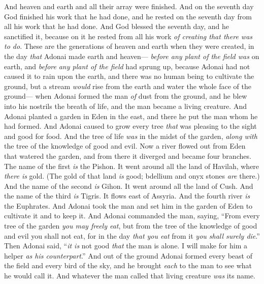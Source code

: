 \begin{biblechapter} %
\verse And heaven and earth and all their array were finished.
\verse And on the seventh day God finished his work that he had done, and he rested on the seventh day from all his work that he had done.
\verse And God blessed the seventh day, and he sanctified it, because on it he rested from all his work \textit{of creating that \textit{there was} to do}.
 These are the generations of heaven and earth when they were created, in the day \textit{that} Adonai made earth and heaven—
\verse \textit{before any plant of the field was} on earth, and \textit{before} \textit{any plant of the field} had sprung up, because Adonai had not caused it to rain upon the earth, and there was no human being to cultivate the ground,
\verse but a stream \textit{would} rise from the earth and water the whole face of the ground—
\verse when Adonai formed the man \textit{of} dust from the ground, and he blew into his nostrils the breath of life, and the man became a living creature.
\verse And Adonai planted a garden in Eden in the east, and there he put the man whom he had formed.
\verse And Adonai caused to grow every tree \textit{that} was pleasing to the sight and good for food. And the tree of life \textit{was} in the midst of the garden, \textit{along with} the tree of the knowledge of good and evil.
\verse Now a river flowed out from Eden that watered the garden, and from there it diverged and became four branches.
\verse The name of the first \textit{is} the Pishon. It went around all the land of Havilah, where \textit{there is} gold.
\verse (The gold of that land \textit{is} good; bdellium and onyx stones \textit{are} there.)
\verse And the name of the second \textit{is} Gihon. It went around all the land of Cush.
\verse And the name of the third \textit{is} Tigris. It flows east of Assyria. And the fourth river \textit{is} the Euphrates.
\verse And Adonai took the man and set him in the garden of Eden to cultivate it and to keep it.
\verse And Adonai commanded the man, saying, “From every tree of the garden \textit{you may freely eat},
\verse but from the tree of the knowledge of good and evil you shall not eat, for in the day \textit{that you eat} from it \textit{you shall surely die}.”
\verse Then Adonai said, “\textit{it is} not good \textit{that} the man is alone. I will make for him a helper \textit{as his counterpart}.”
\verse And out of the ground Adonai formed every beast of the field and every bird of the sky, and he brought \textit{each} to the man to see what he would call it. And whatever the man called that living creature \textit{was} its name.

\end{biblechapter}
